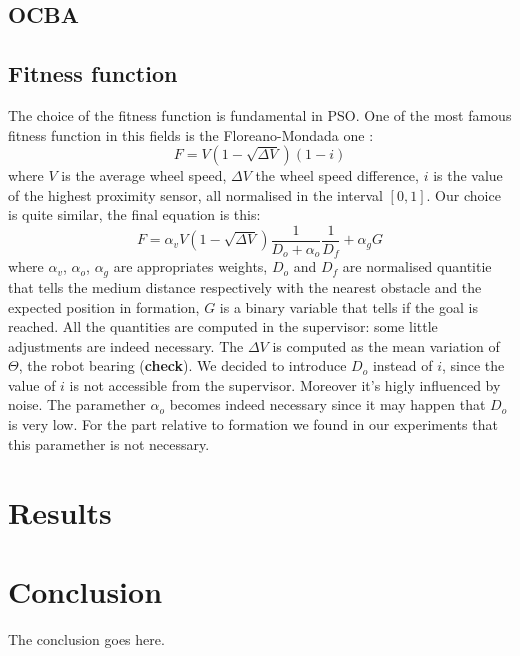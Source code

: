 \documentclass[journal]{IEEEtran}
\begin{document}
\subsection{OCBA}


\subsection{Fitness function}
The choice of the fitness function is fundamental in PSO. One of the
most famous fitness function in this fields is the Floreano-Mondada
one \cite{IEEEhowto:fitness_floreano_mondada}:
\begin {equation}
F=V(1-\sqrt{\Delta V})(1-i)
\end{equation}
where $V$ is the average wheel speed, $\Delta V$ the wheel speed
difference, $i$ is the value of the highest proximity sensor, all
normalised in the interval $[0,1]$.
Our choice is quite similar, the final equation is this:
\begin {equation}
F=\alpha_vV(1-\sqrt{\Delta V})\frac{1}{D_o+\alpha_o}\frac{1}{D_f}+\alpha_gG
\end{equation}
where $\alpha_v$, $\alpha_o$, $\alpha_g$ are appropriates weights,
$D_o$ and $D_f$ are normalised quantitie that tells the medium
distance respectively with the
nearest obstacle and the expected position in formation, 
$G$ is a binary variable that tells if the goal is reached.
All the quantities are computed in the supervisor: some little
adjustments are indeed necessary. The $\Delta V$ is computed as the
mean variation of $\Theta$, the robot bearing (\textbf{check}). We
decided to introduce $D_o$ instead of $i$, since the value of $i$
is not accessible from the supervisor. Moreover it's higly influenced
by noise. The paramether $\alpha_o$ becomes indeed necessary since it
may happen that $D_o$ is very low. For the part relative to formation
we found in our experiments that this paramether is not necessary.

\section{Results}
\label{sec:4}

\section{Conclusion}
\label{sec:5}
The conclusion goes here.





\end{document}

